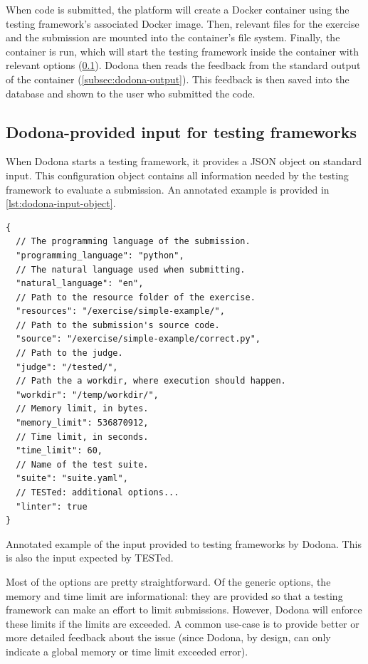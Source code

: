 \documentclass[../main]{subfiles}
\begin{document}
When code is submitted, the platform will create a Docker container using the testing framework's associated Docker image.
Then, relevant files for the exercise and the submission are mounted into the container's file system.
Finally, the container is run, which will start the testing framework inside the container with relevant options (\cref{subsec:dodona-input}).
Dodona then reads the feedback from the standard output of the container (\cref{subsec:dodona-output}).
This feedback is then saved into the database and shown to the user who submitted the code.

\subsection{Dodona-provided input for testing frameworks}\label{subsec:dodona-input}

When Dodona starts a testing framework, it provides a JSON object on standard input.
This configuration object contains all information needed by the testing framework to evaluate a submission.
An annotated example is provided in \cref{lst:dodona-input-object}.

\begin{listing}
    \begin{verbatim}
{
  // The programming language of the submission.
  "programming_language": "python",
  // The natural language used when submitting.
  "natural_language": "en",
  // Path to the resource folder of the exercise.
  "resources": "/exercise/simple-example/",
  // Path to the submission's source code.
  "source": "/exercise/simple-example/correct.py",
  // Path to the judge.
  "judge": "/tested/",
  // Path the a workdir, where execution should happen.
  "workdir": "/temp/workdir/",
  // Memory limit, in bytes.
  "memory_limit": 536870912,
  // Time limit, in seconds.
  "time_limit": 60,
  // Name of the test suite.
  "suite": "suite.yaml",
  // TESTed: additional options...
  "linter": true
}
    \end{verbatim}
    \caption{
        Annotated example of the input provided to testing frameworks by Dodona.
        This is also the input expected by TESTed.
    }
    \label{lst:dodona-input-object}
\end{listing}

Most of the options are pretty straightforward.
Of the generic options, the memory and time limit are informational: they are provided so that a testing framework can make an effort to limit submissions.
However, Dodona will enforce these limits if the limits are exceeded.
A common use-case is to provide better or more detailed feedback about the issue (since Dodona, by design, can only indicate a global memory or time limit exceeded error).
\end{document}
